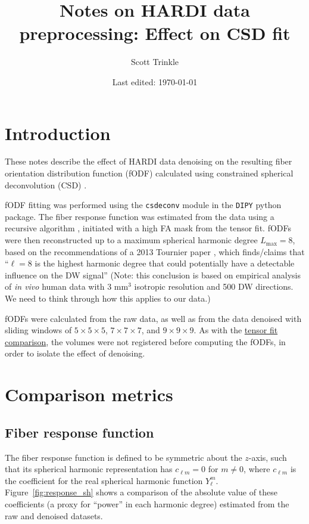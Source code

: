 \documentclass{article}
\title{Notes on HARDI data preprocessing: Effect on CSD fit}
\author{Scott Trinkle}
\date{Last edited: \today}
\begin{document}
\maketitle

\section{Introduction}
These notes describe the effect of HARDI data denoising on the resulting fiber
orientation distribution function (fODF) calculated using constrained spherical
deconvolution (CSD) \cite{Tournier2007}.

fODF fitting was performed using the \texttt{csdeconv} module in the
\texttt{DIPY} python package. The fiber response function was estimated from the
data using a recursive algorithm \cite{Tax2014}, initiated with a high FA mask
from the tensor fit. fODFs were then reconstructed up to a maximum spherical
harmonic degree $L_{\text{max}} = 8$, based on the recommendations of a 2013
Tournier paper \cite{Tournier2013}, which finds/claims that ``$\ell=8$ is the
highest harmonic degree that could potentially have a detectable influence on
the DW signal'' (Note: this conclusion is based on empirical analysis of
\textit{in vivo} human data with 3 mm$^3$ isotropic resolution and 500 DW
directions. We need to think through how this applies to our data.)

fODFs were calculated from the raw data, as well
as from the data denoised with sliding windows of $5\times 5\times 5$,
$7\times 7\times 7$, and $9\times 9\times 9$. As with the
\href{https://github.com/scott-trinkle/hardi/blob/master/dti/compare_denoise_widths/report/tensorfit_notes.pdf}{tensor
  fit comparison}, the volumes were not registered before computing the fODFs,
in order to isolate the effect of denoising.

\section{Comparison metrics}

\subsection{Fiber response function}

The fiber response function is defined to be symmetric about the $z$-axis, such
that its spherical harmonic representation has $c_{\ell m} = 0$ for $m \neq 0$,
where $c_{\ell m}$ is the coefficient for the real spherical harmonic function
$Y_{\ell}^m$. Figure~\ref{fig:response_sh} shows a comparison of the absolute
value of these coefficients (a proxy for ``power'' in each harmonic degree)
estimated from the raw and denoised datasets.
\end{document}
